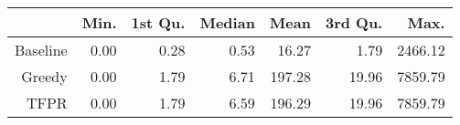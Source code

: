 \begin{table}[ht]
\centering
\begin{tabular}{rrrrrrr}
  \hline
 & Min. & 1st Qu. & Median & Mean & 3rd Qu. & Max. \\ 
  \hline
Baseline & 0.00 & 0.28 & 0.53 & 16.27 & 1.79 & 2466.12 \\ 
  Greedy & 0.00 & 1.79 & 6.71 & 197.28 & 19.96 & 7859.79 \\ 
  TFPR & 0.00 & 1.79 & 6.59 & 196.29 & 19.96 & 7859.79 \\ 
   \hline
\end{tabular}
\end{table}
